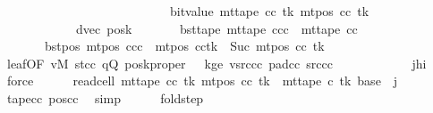 \begin{isabellebody}
\ \ \ \ \ \ \ \ \ \ \ \ \ \ \ \ \ \ \ \ \ \ \ \ \ \ {\isacharplus}{\kern0pt}\ bit{\isacharunderscore}{\kern0pt}value\ {\isacharparenleft}{\kern0pt}mt{\isacharunderscore}{\kern0pt}tape\ cc\ tk\ {\isacharparenleft}{\kern0pt}mt{\isacharunderscore}{\kern0pt}pos\ cc\ tk{\isacharparenright}{\kern0pt}{\isacharparenright}{\kern0pt}{\isacharparenright}{\kern0pt}{\isacharparenright}{\kern0pt}{\isacharcomma}{\kern0pt}\isanewline
\ \ \ \ \ \ \ \ \ \ \ \ dvec{\isacharcomma}{\kern0pt}\ posk{\isacharparenright}{\kern0pt}{\isachardoublequoteclose}\isanewline
\ \ \ \ \ \ \ bst{\isacharunderscore}{\kern0pt}tape{\isacharcolon}{\kern0pt}\ {\isachardoublequoteopen}mt{\isacharunderscore}{\kern0pt}tape\ ccc\ {\isacharequal}{\kern0pt}\ mt{\isacharunderscore}{\kern0pt}tape\ cc{\isachardoublequoteclose}\isanewline
\ \ \ \ \ \ \ bst{\isacharunderscore}{\kern0pt}pos{\isacharcolon}{\kern0pt}\ {\isachardoublequoteopen}mt{\isacharunderscore}{\kern0pt}pos\ ccc\ {\isacharequal}{\kern0pt}\ {\isacharparenleft}{\kern0pt}mt{\isacharunderscore}{\kern0pt}pos\ cc{\isacharparenright}{\kern0pt}{\isacharparenleft}{\kern0pt}tk\ {\isacharcolon}{\kern0pt}{\isacharequal}{\kern0pt}\ Suc\ {\isacharparenleft}{\kern0pt}mt{\isacharunderscore}{\kern0pt}pos\ cc\ tk{\isacharparenright}{\kern0pt}{\isacharparenright}{\kern0pt}{\isachardoublequoteclose}\isanewline
\ \ \ \ \ \ \isamarkupfalse%
\ leaf{\isacharbrackleft}{\kern0pt}OF\ vM\ st{\isacharunderscore}{\kern0pt}cc\ qQ\ posk{\isacharunderscore}{\kern0pt}proper\ {\isacharunderscore}{\kern0pt}\ {\isacharunderscore}{\kern0pt}\ kge{}\ vsrc{\isacharunderscore}{\kern0pt}cc\ pad{\isacharunderscore}{\kern0pt}cc\ src{\isacharunderscore}{\kern0pt}cc{\isacharbrackright}{\kern0pt}\isanewline
\ \ \ \ \ \ \ \ \ \ \ \ jhi\ \isamarkupfalse%
\ force\isanewline
\ \ \ \ \isamarkupfalse%
\ read{\isacharunderscore}{\kern0pt}cell{\isacharcolon}{\kern0pt}\ {\isachardoublequoteopen}mt{\isacharunderscore}{\kern0pt}tape\ cc\ tk\ {\isacharparenleft}{\kern0pt}mt{\isacharunderscore}{\kern0pt}pos\ cc\ tk{\isacharparenright}{\kern0pt}\ {\isacharequal}{\kern0pt}\ mt{\isacharunderscore}{\kern0pt}tape\ c{\isacharprime}{\kern0pt}\ tk\ {\isacharparenleft}{\kern0pt}base\ {\isacharplus}{\kern0pt}\ j{\isacharparenright}{\kern0pt}{\isachardoublequoteclose}\isanewline
\ \ \ \ \ \ \isamarkupfalse%
\ tape{\isacharunderscore}{\kern0pt}cc\ pos{\isacharunderscore}{\kern0pt}cc\ \isamarkupfalse%
\ simp\isanewline
\ \ \ \ \isamarkupfalse%
\ fold{\isacharunderscore}{\kern0pt}step{\isacharcolon}{\kern0pt}\isanewline

\end{isabellebody}
